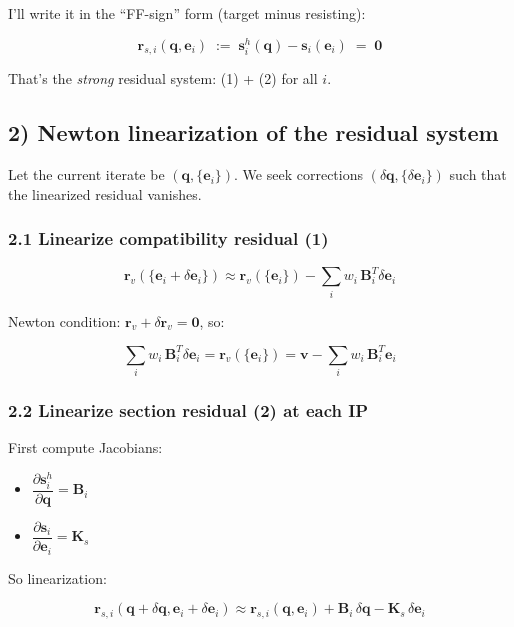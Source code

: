 I'll write it in the ``FF-sign'' form (target minus resisting):

\[
\mathbf{r}_{s,i}(\bm{q},\mathbf{e}_i)\;:=\;\mathbf{s}^h_i(\bm{q}) - \mathbf{s}_i(\mathbf{e}_i)\;=\;\mathbf{0}
\tag{2}
\]

That's the \emph{strong} residual system: (1) + (2) for all \(i\).

\subsection{2) Newton linearization of the residual
system}\label{newton-linearization-of-the-residual-system}

Let the current iterate be \((\bm{q},\{\mathbf{e}_i\})\). We seek
corrections \((\delta\bm{q},\{\delta\mathbf{e}_i\})\) such that the
linearized residual vanishes.

\subsubsection{2.1 Linearize compatibility residual
(1)}\label{linearize-compatibility-residual-1}

\[
\mathbf{r}_v(\{\mathbf{e}_i+\delta\mathbf{e}_i\})
\approx
\mathbf{r}_v(\{\mathbf{e}_i\})
-
\sum_i w_i\,\mathbf{B}_i^{T}\delta\mathbf{e}_i
\]

Newton condition: \(\mathbf{r}_v + \delta\mathbf{r}_v = \mathbf{0}\),
so:

\[
\sum_i w_i\,\mathbf{B}_i^{T}\delta\mathbf{e}_i
=
\mathbf{r}_v(\{\mathbf{e}_i\})
=
\bm{v}-\sum_i w_i\,\mathbf{B}_i^T\mathbf{e}_i
\tag{3}
\]

\subsubsection{2.2 Linearize section residual (2) at each
IP}\label{linearize-section-residual-2-at-each-ip}

First compute Jacobians:

\begin{itemize}
\tightlist
\item
  \(\dfrac{\partial \mathbf{s}^h_i}{\partial \bm{q}}=\mathbf{B}_i\)
\item
  \(\dfrac{\partial \mathbf{s}_i}{\partial \mathbf{e}_i}=\mathbf{K}_{s}\)
\end{itemize}

So linearization:

\[
\mathbf{r}_{s,i}(\bm{q}+\delta\bm{q},\mathbf{e}_i+\delta\mathbf{e}_i)
\approx
\mathbf{r}_{s,i}(\bm{q},\mathbf{e}_i)
+
\mathbf{B}_i\,\delta\bm{q}
-
\mathbf{K}_{s}\,\delta\mathbf{e}_i
\]

